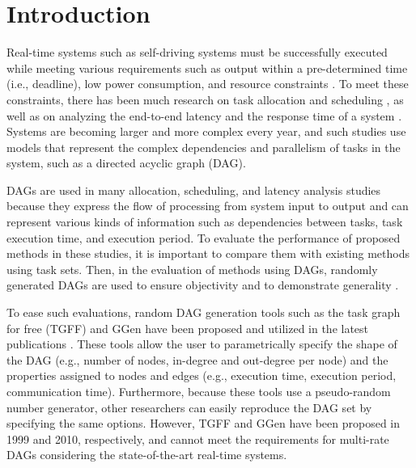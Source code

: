 \section{Introduction}
\label{sec: introduction}

Real-time systems such as self-driving systems must be successfully executed while meeting various requirements such as output within a pre-determined time (i.e., deadline), low power consumption, and resource constraints \cite{koike2021federated, senapati2021hmds, kaur2020deep}.
To meet these constraints, there has been much research on task allocation and scheduling \cite{igarashi2021accurate, asghari2020online, tong2020ql}, as well as on analyzing the end-to-end latency and the response time of a system \cite{yang2020exploring, kordon2020evaluation, chen2021partial}.
Systems are becoming larger and more complex every year, and such studies use models that represent the complex dependencies and parallelism of tasks in the system, such as a directed acyclic graph (DAG).

DAGs are used in many allocation, scheduling, and latency analysis studies \cite{choi2021picas, nguyen2019cache, klaus2021constrained} because they express the flow of processing from system input to output and can represent various kinds of information such as dependencies between tasks, task execution time, and execution period.
To evaluate the performance of proposed methods in these studies, it is important to compare them with existing methods using task sets.
Then, in the evaluation of methods using DAGs, randomly generated DAGs are used to ensure objectivity and to demonstrate generality \cite{dai2021timing, verucchi2020latency, gunzel2021suspension}.

To ease such evaluations, random DAG generation tools such as the task graph for free (TGFF) \cite{tgff} and GGen \cite{cordeiro2010random} have been proposed and utilized in the latest publications \cite{sun2021deepweave, huang2020hda, rouxel-free, cao2018affinity}.
These tools allow the user to parametrically specify the shape of the DAG (e.g., number of nodes, in-degree and out-degree per node) and the properties assigned to nodes and edges (e.g., execution time, execution period, communication time).
Furthermore, because these tools use a pseudo-random number generator, other researchers can easily reproduce the DAG set by specifying the same options.
However, TGFF and GGen have been proposed in 1999 and 2010, respectively, and cannot meet the requirements for multi-rate DAGs considering the state-of-the-art real-time systems.


